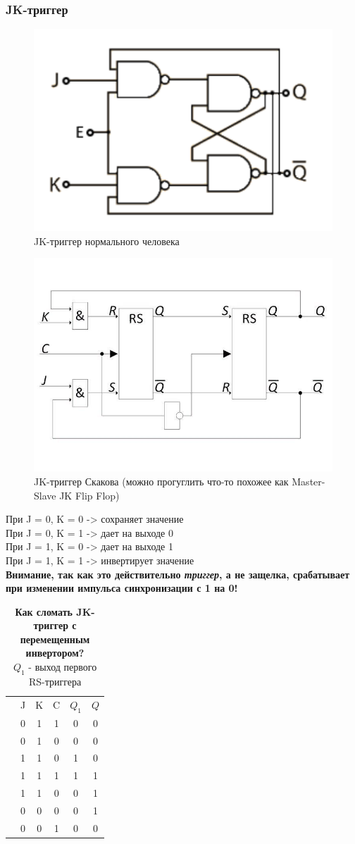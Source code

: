 \documentclass[12pt, a4paper]{article}
\begin{document}
\subsubsection{JK-триггер}
\begin{figure}[h!]
    \includegraphics[width=0.5\linewidth]{./images/3_24.png}
    \caption{JK-триггер нормального человека}
    \label{fig:my_label}
\end{figure}
\begin{figure}[h!]
    \includegraphics[width=0.4\linewidth]{./images/JK.jpg}
    \caption{JK-триггер Скакова (можно прогуглить что-то похожее как Master-Slave JK Flip Flop)}
    \label{fig:my_label}
\end{figure}
При J = 0, K = 0 -> сохраняет значение\\
При J = 0, K = 1 -> дает на выходе 0\\
При J = 1, K = 0 -> дает на выходе 1\\
При J = 1, K = 1 -> инвертирует значение\\
\textbf{Внимание, так как это действительно \textit{триггер}, а не защелка, срабатывает при изменении импульса синхронизации с 1 на 0!}\\
\begin{table}[h!]
    \centering
    \begin{tabular}{c|c|c|c|c|c|}
         & J & K & C & $Q_1$ & $Q$ \\
         & 0 & 1 & 1 & 0 & 0\\
         & 0 & 1 & 0 & 0 & 0\\
         & 1 & 1 & 0 & 1 & 0\\
         & 1 & 1 & 1 & 1 & 1\\
         & 1 & 1 & 0 & 0 & 1\\
         & 0 & 0 & 0 & 0 & 1\\
         & 0 & 0 & 1 & 0 & 0
    \end{tabular}
    \caption{\textbf{Как сломать JK-триггер с перемещенным инвертором?}\\$Q_1$ - выход первого RS-триггера}
    \label{tab:my_label}
\end{table}
\end{document}
